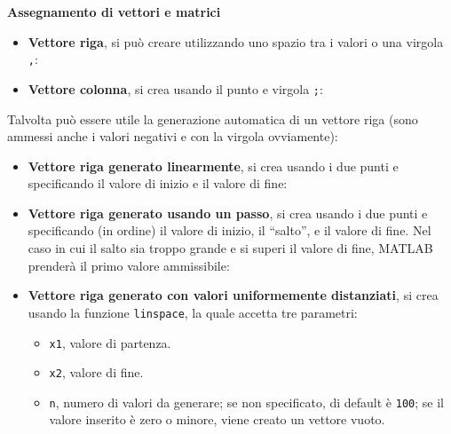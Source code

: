 \documentclass[a4paper]{article}
\newcommand{\dquotes}[1]{``#1''}
\begin{document}
    \newpage

    \begin{flushleft}
        \large
        \hypertarget{
            lab: Assegnamento di vettori e matrici
        }{
            \textcolor{Red3}{\textbf{Assegnamento di vettori e matrici}}
        }
        \label{lab: Assegnamento di vettori e matrici}
    \end{flushleft}
    \begin{itemize}
        \item \textbf{Vettore riga}, si può creare utilizzando uno spazio tra i valori o una virgola \texttt{,}:
        

        \item \textbf{Vettore colonna}, si crea usando il punto e virgola \texttt{;}:
        
    \end{itemize}
    Talvolta può essere utile la generazione automatica di un vettore riga (sono ammessi anche i valori negativi e con la virgola ovviamente):
    \begin{itemize}
        \item \textbf{Vettore riga generato linearmente}, si crea usando i due punti e specificando il valore di inizio e il valore di fine:
        

        \item \textbf{Vettore riga generato usando un passo}, si crea usando i due punti e specificando (in ordine) il valore di inizio, il \dquotes{salto}, e il valore di fine. Nel caso in cui il salto sia troppo grande e si superi il valore di fine, MATLAB prenderà il primo valore ammissibile:
        

        \item \textbf{Vettore riga generato con valori uniformemente distanziati}, si crea usando la funzione \texttt{linspace}, la quale accetta tre parametri:
        \begin{itemize}
            \item \texttt{x1}, valore di partenza.
            \item \texttt{x2}, valore di fine.
            \item \texttt{n}, numero di valori da generare; se non specificato, di default è \texttt{100}; se il valore inserito è zero o minore, viene creato un vettore vuoto.
        \end{itemize}
        
    \end{itemize}
\end{document}
